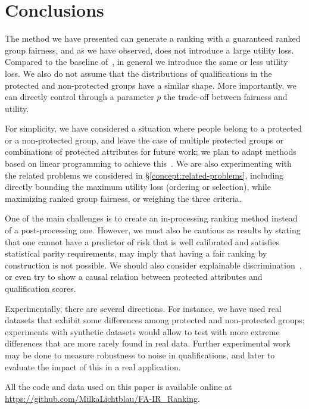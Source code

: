 \section{Conclusions}\label{sec:conclusions}

The method we have presented can generate a ranking with a guaranteed ranked group fairness, and as we have observed, does not introduce a large utility loss.
%
Compared to the baseline of~\citet{Feldman2015}, in general we introduce the same or less utility loss. We also do not assume that the distributions of qualifications in the protected and non-protected groups have a similar shape.
%
More importantly, we can directly control through a parameter $p$ the trade-off between fairness and utility.

For simplicity, we have considered a situation where people belong to a protected or a non-protected group, and leave the case of multiple protected groups or combinations of protected attributes for future work; we plan to adapt methods based on linear programming to achieve this~\cite{celis2017ranking}.
%
We are also experimenting with the related problems we considered in \S\ref{concept:related-problems}, including directly bounding the maximum utility loss (ordering or selection), while maximizing ranked group fairness, or weighing the three criteria.

One of the main challenges is to create an in-processing ranking method instead of a post-processing one. However, we must also be cautious as results by \citet{kleinberg2016inherent} stating that one cannot have a predictor of risk that is well calibrated and satisfies statistical parity requirements, may imply that having a fair ranking by construction is not possible. We should also consider explainable discrimination~\cite{vzliobaite2011handling}, or even try to show a causal relation between protected attributes and qualification scores.

Experimentally, there are several directions. For instance, we have used real datasets that exhibit some differences among protected and non-protected groups; experiments with synthetic datasets would allow to test with more extreme differences that are more rarely found in real data.
%
Further experimental work may be done to measure robustness to noise in qualifications, and later to evaluate the impact of this in a real application.

All the code and data used on this paper is available online at \url{https://github.com/MilkaLichtblau/FA-IR_Ranking}.
